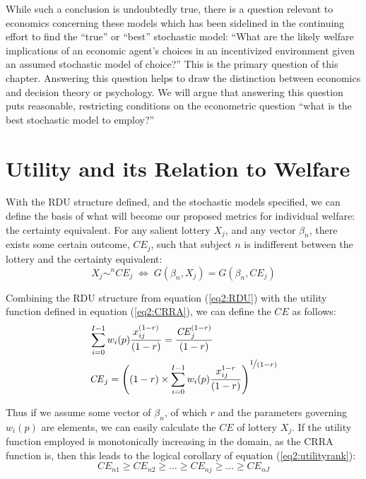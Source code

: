 \documentclass[11pt,a4paper]{report}
\newcommand\CE{\ensuremath{\mathit{CE}}}    %
\begin{document}
While such a conclusion is undoubtedly true, there is a question relevant to economics concerning these models which has been sidelined in the continuing effort to find the \enquote{true} or \enquote{best} stochastic model: \enquote{What are the likely welfare implications of an economic agent's choices in an incentivized environment given an assumed stochastic model of choice?} This is the primary question of this chapter.
Answering this question helps to draw the distinction between economics and decision theory or psychology.
We will argue that answering this question puts reasonable, restricting conditions on the econometric question \enquote{what is the best stochastic model to employ?}

\section{Utility and its Relation to Welfare}

With the RDU structure defined, and the stochastic models specified, we can define the basis of what will become our proposed metrics for individual welfare: the certainty equivalent.
For any salient lottery $X_j$, and any vector $\beta_n$, there exists some certain outcome, $\CE_j$, such that subject $n$ is indifferent between the lottery and the certainty equivalent:
\begin{equation}
	\label{eq2:CE.indiff}
	X_j \sim^n {\CE}_j \;\Leftrightarrow\; G(\beta_n,X_j) = G(\beta_n, {\CE}_j)
\end{equation}

Combining the RDU structure from equation (\ref{eq2:RDU}) with the utility function defined in equation (\ref{eq2:CRRA}), we can define the {\CE} as follows:
\begin{align}
	\label{eq2:CEcalc}
	\begin{split}
		&\sum_{i=0}^{I-1} w_i(p) \frac{x_{ij}^{(1-r)}}{(1-r)} = \frac{ {\CE}_j^{(1-r)}}{(1-r)}\\
		&{\CE}_j =  \left( (1-r) \times \sum_{i=0}^{I-1} w_i(p) \frac{x_{ij}^{1-r}}{(1-r)} \right)^{ \displaystyle\nicefrac{1}{(1-r)} }
	\end{split}
\end{align}

Thus if we assume some vector of $\beta_n$, of which $r$ and the parameters governing $w_i(p)$ are elements, we can easily calculate the {\CE} of lottery $X_j$.{\footnotemark}
If the utility function employed is monotonically increasing in the domain, as the CRRA function is, then this leads to the  logical corollary of equation (\ref{eq2:utilityrank}):
\begin{equation}
	\label{eq2:CErank}
	{\CE}_{n1} \geq {\CE}_{n2} \geq \ldots \geq {\CE}_{nj} \geq \ldots \geq {\CE}_{nJ}
\end{equation}
\end{document}
